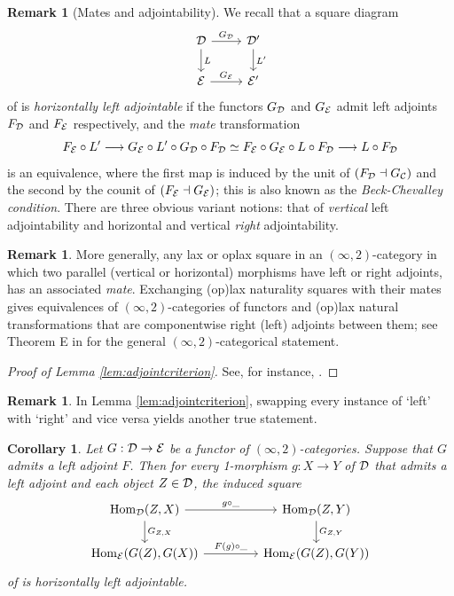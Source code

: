 \documentclass[10pt, reqno, twoside
, final
]{amsart}
\numberwithin{equation}{subsection}%
\theoremstyle{definition}
\theoremstyle{definition}
\theoremstyle{definition}
\theoremstyle{definition}
\theoremstyle{definition}
\theoremstyle{definition}
\theoremstyle{definition}
\theoremstyle{definition}
\theoremstyle{definition}
\theoremstyle{plain}
\theoremstyle{definition}
\theoremstyle{plain}
\theoremstyle{definition}
\theoremstyle{plain}
\newtheorem{cor}[defn]{Corollary}
\theoremstyle{definition}
\newtheorem{rmk}[defn]{Remark}
\theoremstyle{definition}
\theoremstyle{plain}
\theoremstyle{plain}
\theoremstyle{definition}
\theoremstyle{plain}
\theoremstyle{plain}
\theoremstyle{plain}
\begin{document}
\begin{rmk}[Mates and adjointability]
We recall that a square diagram 
\[
\begin{tikzcd}
 \icatd \ar[r,"G_{\icatd}"] \ar[d,"L"] & \icatd' \ar[d,"L'"] \\
 \icate\ar[r,"G_{\icate}"] & \icate'
\end{tikzcd}
\]
of \infcats is \emph{horizontally left adjointable} if the functors $G_{\mathcal{D}}$ and $G_{\mathcal{E}}$ admit left adjoints $F_{\mathcal{D}}$ and $F_{\mathcal{E}}$ respectively, and the \emph{mate} transformation 
\[ F_{\mathcal{E}}\circ L'\longrightarrow  G_{\mathcal{E}}\circ L' \circ G_{\mathcal{D}} \circ F_{\mathcal{D}} \simeq F_{\mathcal{E}} \circ G_{\mathcal{E}}\circ L\circ F_{\mathcal{D}} \longrightarrow L\circ F_{\mathcal{D}}\]
is an equivalence, where the first map is induced by the unit of $(F_{\mathcal{D}}\dashv G_{\mathcal{C}})$ and the second by the counit of $(F_{\mathcal{E}}\dashv G_{\mathcal{E}})$; this is also known as the \emph{Beck-Chevalley condition}. There are three obvious variant notions: that of \emph{vertical} left adjointability and horizontal and vertical \emph{right} adjointability.
\end{rmk}
\begin{rmk}\label{rmk:mates}
More generally, any lax or oplax square in an $(\infty,2)$-category in which two parallel (vertical or horizontal) morphisms have left or right adjoints, has an associated \emph{mate}. Exchanging (op)lax naturality squares with their mates gives equivalences of $(\infty,2)$-categories of functors and (op)lax natural transformations that are componentwise right (left) adjoints between them; see Theorem E in \cite{AGH-laxstraigthening} for the general $(\infty,2)$-categorical statement. 
\end{rmk}
\begin{proof}[Proof of Lemma \ref{lem:adjointcriterion}]
See, for instance, \cite[Corollary 5.2.10]{AGH-laxstraigthening}.
\end{proof}
\begin{rmk}\label{rmk:flippedadjointcrit}
In Lemma \ref{lem:adjointcriterion}, swapping every instance of `left' with `right' and vice versa yields another true statement.   
\end{rmk}
\begin{cor}\label{cor:inducedadjointability}
Let $G:\mathcal{D}\rightarrow \mathcal{E}$ be a functor of $(\infty,2)$-categories. Suppose that $G$ admits a left adjoint $F$. Then for every 1-morphism $g:X\rightarrow Y$ of $\mathcal{D}$ that admits a left adjoint and each object $Z\in \mathcal{D}$, the induced square
\[
\begin{tikzcd}
  \Hom_{\icatd}(Z,X) \ar[d,"G_{Z,X}"] \ar[r,"g\circ \_"] &[2em]   \Hom_{\icatd}(Z,Y) \ar[d,"G_{Z,Y}"] \\
  \Hom_{\icate}(G(Z),G(X)) \ar[r,"F(g)\circ \_"] &[2em]   \Hom_{\icate}(G(Z),G(Y))
\end{tikzcd}
\]
of \infcats is horizontally left adjointable. 
\end{cor}
\end{document}
